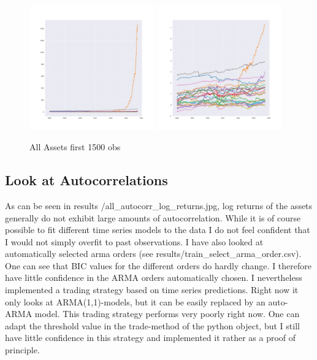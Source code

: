 \begin{figure}[h!]
    \centering
    \includegraphics[width=0.48\textwidth]{../results/train_all_assets.jpg}
    \includegraphics[width=0.48\textwidth]{../results/train_all_assets_logged.jpg}
    \caption{All Assets first 1500 obs}
    \label{1}
  
\end{figure}{}

\subsection{Look at Autocorrelations}
As can be seen in results \slash all\_autocorr\_log\_returns.jpg, log returns of the assets generally do not exhibit large amounts of autocorrelation. While it is of course possible to fit different time series models to the data I do not feel confident that I would not simply overfit to past observations. I have also looked at automatically selected arma orders (see results\slash train\_select\_arma\_order.csv). One can see that BIC values for the different orders do hardly change. I therefore have little confidence in the ARMA orders automatically chosen. I nevertheless implemented a trading strategy based on time series predictions. Right now it only looks at ARMA(1,1)-models, but it can be easily replaced by an auto-ARMA model. This trading strategy performs very poorly right now. One can adapt the threshold value in the trade-method of the python object, but I still have little confidence in this strategy and implemented it rather as a proof of principle. 


